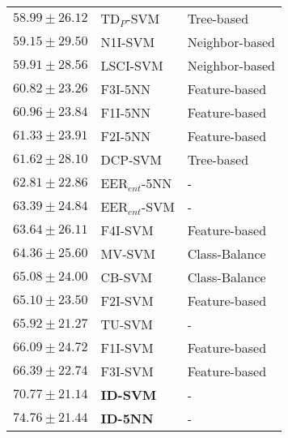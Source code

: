 \begin{tabular}{lll}
$58.99\pm26.12$ & TD$_P$-SVM & Tree-based \\
$59.15\pm29.50$ & N1I-SVM & Neighbor-based \\
$59.91\pm28.56$ & LSCI-SVM & Neighbor-based \\
$60.82\pm23.26$ & F3I-5NN & Feature-based \\
$60.96\pm23.84$ & F1I-5NN & Feature-based \\
$61.33\pm23.91$ & F2I-5NN & Feature-based \\
$61.62\pm28.10$ & DCP-SVM & Tree-based \\
$62.81\pm22.86$ & EER$_{ent}$-5NN & - \\
$63.39\pm24.84$ & EER$_{ent}$-SVM & - \\
$63.64\pm26.11$ & F4I-SVM & Feature-based \\
$64.36\pm25.60$ & MV-SVM & Class-Balance \\
$65.08\pm24.00$ & CB-SVM & Class-Balance \\
$65.10\pm23.50$ & F2I-SVM & Feature-based \\
$65.92\pm21.27$ & TU-SVM & - \\
$66.09\pm24.72$ & F1I-SVM & Feature-based \\
$66.39\pm22.74$ & F3I-SVM & Feature-based \\
$70.77\pm21.14$ & \textbf{ID-SVM} & - \\
$74.76\pm21.44$ & \textbf{ID-5NN} & - \\
\bottomrule
\end{tabular}
